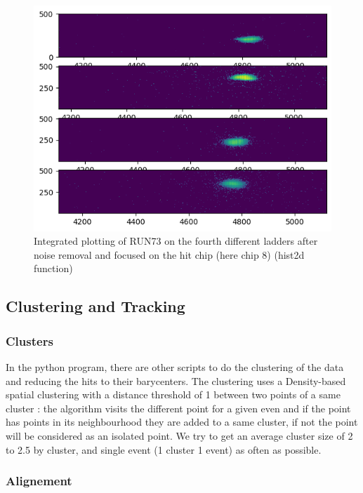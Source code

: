 \documentclass[12pt,oneside,a4]{article}
\begin{document}
    \begin{figure}[h]
        \centering
        \includegraphics[scale =0.5]{figures/With_noise_removal_and_chip_focus.png}
        \caption{Integrated plotting of RUN73 on the fourth different ladders after noise removal and focused on the hit chip (here chip 8) (hist2d function)}
        \label{fig:13}
    \end{figure}
\newpage
    \subsection{Clustering and Tracking}
    \subsubsection{Clusters}
    In the python program, there are other scripts to do the clustering of the data and reducing the hits to their barycenters. 
    The clustering uses a Density-based spatial clustering with a distance threshold of 1 between two points of a same cluster : the algorithm visits the different point for a given even and if the point has points in its neighbourhood they are added to a same cluster, if not the point will be considered as an isolated point. 
    We try to get an average cluster size of 2 to 2.5 by cluster, and single event (1 cluster 1 event) as often as possible. 
    \subsubsection{Alignement}

    
\end{document}
